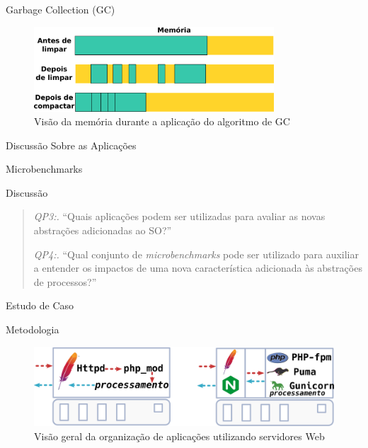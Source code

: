 \documentclass[xcolor={usenames,svgnames,dvipsnames},brazil,english,12pt,aspectratio=149]{beamer}
\begin{document}
\begin{frame}{Garbage Collection (GC)}
	\begin{figure}[!h]
		\centering
		\includegraphics[width=0.8\textwidth]{gc_memory}
		\caption{Visão da memória durante a aplicação do algoritmo de GC}
		\label{fig:gc_mem}
	\end{figure}
\end{frame}

\begin{frame}{Discussão Sobre as Aplicações}
	
\end{frame}

\begin{frame}{Microbenchmarks}
\end{frame}

\begin{frame}{Discussão}
	\begin{quote}
		\item \emph{QP3:.} ``Quais aplicações podem ser utilizadas para avaliar as novas abstrações adicionadas ao SO?''
		\item \emph{QP4:.} ``Qual conjunto de \emph{microbenchmarks} pode ser utilizado para auxiliar a entender os impactos de uma nova característica adicionada às abstrações de processos?''
	\end{quote}
\end{frame}

\begin{frame}{Estudo de Caso}
\end{frame}

\begin{frame}{Metodologia}
	\begin{figure}[!h] \centering
		\includegraphics[width=.60\textwidth]{web_server_organization_strategy}
		\caption{Visão geral da organização de aplicações utilizando servidores Web}
	\label{fig:web_server} \end{figure}
\end{frame}
\end{document}
